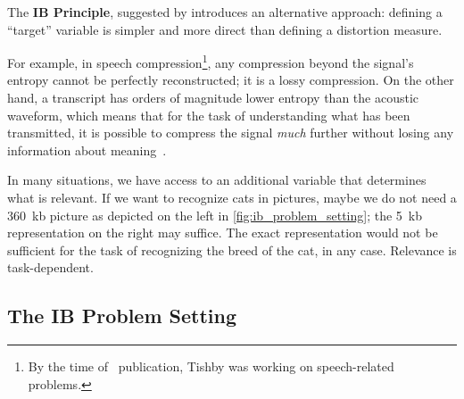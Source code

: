 The \textbf{IB Principle}, suggested by \citeauthor{tishby:1999}\cite{tishby:1999} introduces an alternative approach: defining a ``target'' variable is simpler and more direct than defining a distortion measure.

For example, in speech compression\footnote{By the time of~ publication, Tishby was working on speech-related problems.}, any compression beyond the signal's entropy cannot be perfectly reconstructed; it is a lossy compression. On the other hand, a transcript has orders of magnitude lower entropy than the acoustic waveform, which means that for the task of understanding what has been transmitted, it is possible to compress the signal \emph{much} further without losing any information about meaning~\cite{tishby:1999}.


In many situations, we have access to an additional variable that determines what is relevant. If we want to recognize cats in pictures, maybe we do not need a 360~kb picture as depicted on the left in \cref{fig:ib_problem_setting}; the 5~kb representation on the right may suffice. The exact representation would not be sufficient for the task of recognizing the breed of the cat, in any case. Relevance is task-dependent.


\subsection{The IB Problem Setting}\label{ib_problem_setting}
